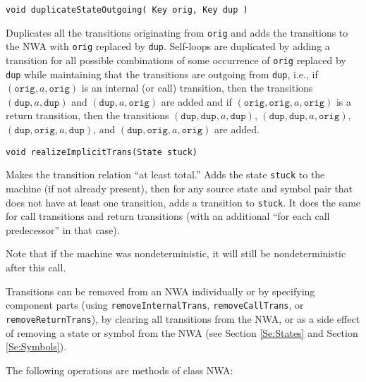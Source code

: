 \begin{description}
  \item\texttt{void duplicateStateOutgoing( Key orig, Key dup )} \nopagebreak

    Duplicates all the transitions originating from \texttt{orig} and adds
    the transitions to the NWA with \texttt{orig} replaced by \texttt{dup}.
    Self-loops are duplicated by adding a transition for all possible
    combinations of some occurrence of \texttt{orig} replaced by \texttt{dup}
    while maintaining that the transitions are outgoing from \texttt{dup},
    i.e., if $(\texttt{orig},a,\texttt{orig})$ is an internal (or call)
    transition, then the transitions $(\texttt{dup},a,\texttt{dup})$ and
    $(\texttt{dup},a,\texttt{orig})$ are added and if
    $(\texttt{orig},\texttt{orig},a,\texttt{orig})$ is a return transition,
    then the transitions $(\texttt{dup},\texttt{dup},a,\texttt{dup})$,
    $(\texttt{dup},\texttt{dup},a,\texttt{orig})$,
    $(\texttt{dup},\texttt{orig},a,\texttt{dup})$, and
    $(\texttt{dup},\texttt{orig},a,\texttt{orig})$ are added.

  \item\texttt{void realizeImplicitTrans(State stuck)} \nopagebreak

    Makes the transition relation ``at least total.''
    Adds the state \texttt{stuck} to the machine (if not already present),
    then for any source state and symbol pair that does not have at least one
    transition, adds a transition to \texttt{stuck}. It does the same for
    call transitions and return transitions (with an additional ``for each
    call predecessor'' in that case).

    Note that if the machine was nondeterministic, it will still be
    nondeterministic after this call.

\end{description} 

Transitions can be removed from an NWA individually or by
specifying component parts (using \texttt{removeInternalTrans},
\texttt{removeCallTrans}, or \texttt{removeReturnTrans}), by clearing all
transitions from the NWA, or as a side effect of removing a state or symbol
from the NWA (see Section \ref{Se:States} and Section \ref{Se:Symbols}).

\noindent The following operations are methods of class NWA:

